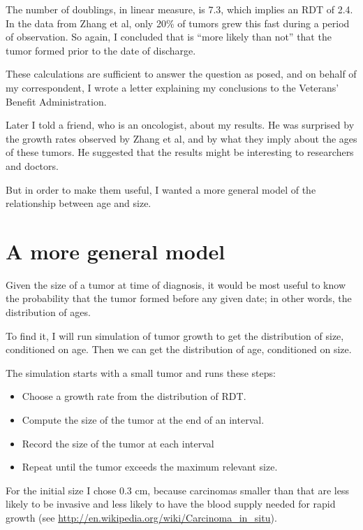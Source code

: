 \documentclass[12pt]{book}
\begin{document}
The number of doublings, in linear measure, is 7.3, which implies
an RDT of 2.4.  In the data from Zhang et al, only 20\% of tumors
grew this fast during a period of observation.  So again,
I concluded that is ``more likely than not'' that the tumor
formed prior to the date of discharge.

These calculations are sufficient to answer the question as
posed, and on behalf of my correspondent, I wrote a letter explaining
my conclusions to the Veterans' Benefit Administration.

Later I told a friend, who is an oncologist, about my results.  He was
surprised by the growth rates observed by Zhang et al, and by what
they imply about the ages of these tumors.  He suggested that the
results might be interesting to researchers and doctors.

But in order to make them useful, I wanted a more general model
of the relationship between age and size.


\section{A more general model}

Given the size of a tumor at time of diagnosis, it would be most
useful to know the probability that the tumor formed before
any given date; in other words, the distribution of ages.

To find it, I will run simulation of tumor growth to get the
distribution of size, conditioned on age.  Then we can get the
distribution of age, conditioned on size.

The simulation starts with a small tumor and runs these steps:

\begin{itemize}

\item Choose a growth rate from the distribution of RDT.

\item Compute the size of the tumor at the end of an interval.

\item Record the size of the tumor at each interval

\item Repeat until the tumor exceeds the maximum relevant size.

\end{itemize}

For the initial size I chose 0.3 cm, because carcinomas smaller than
that are less likely to be invasive and less likely to have the blood
supply needed for rapid growth (see
\url{http://en.wikipedia.org/wiki/Carcinoma_in_situ}).  
\end{document}
